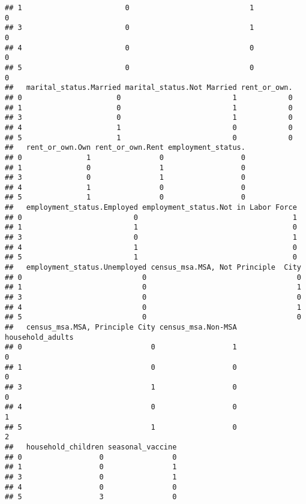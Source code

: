 \documentclass[
]{article}
\begin{document}
\begin{verbatim}
## 1                        0                            1               0
## 3                        0                            1               0
## 4                        0                            0               0
## 5                        0                            0               0
##   marital_status.Married marital_status.Not Married rent_or_own.
## 0                      0                          1            0
## 1                      0                          1            0
## 3                      0                          1            0
## 4                      1                          0            0
## 5                      1                          0            0
##   rent_or_own.Own rent_or_own.Rent employment_status.
## 0               1                0                  0
## 1               0                1                  0
## 3               0                1                  0
## 4               1                0                  0
## 5               1                0                  0
##   employment_status.Employed employment_status.Not in Labor Force
## 0                          0                                    1
## 1                          1                                    0
## 3                          0                                    1
## 4                          1                                    0
## 5                          1                                    0
##   employment_status.Unemployed census_msa.MSA, Not Principle  City
## 0                            0                                   0
## 1                            0                                   1
## 3                            0                                   0
## 4                            0                                   1
## 5                            0                                   0
##   census_msa.MSA, Principle City census_msa.Non-MSA household_adults
## 0                              0                  1                0
## 1                              0                  0                0
## 3                              1                  0                0
## 4                              0                  0                1
## 5                              1                  0                2
##   household_children seasonal_vaccine
## 0                  0                0
## 1                  0                1
## 3                  0                1
## 4                  0                0
## 5                  3                0
\end{verbatim}
\end{document}
